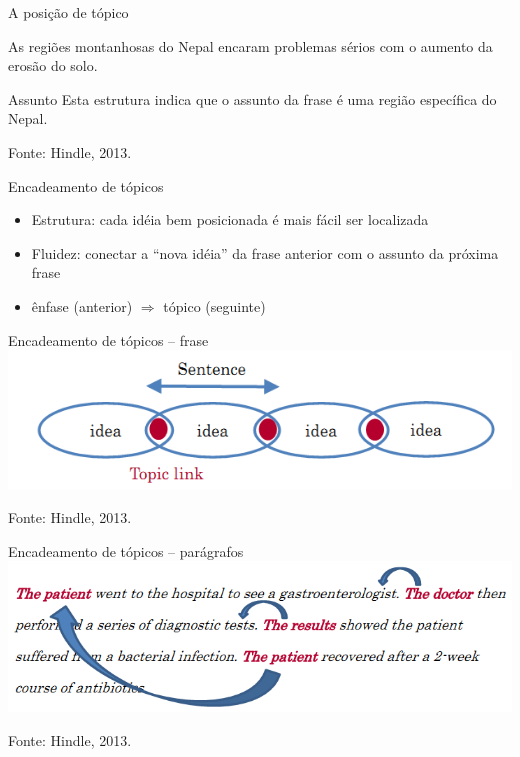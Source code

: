 \documentclass{beamer}
\begin{document}
\begin{frame}{A posição de tópico}
  \begin{example}
    As \alert<3->{regiões montanhosas do Nepal} encaram problemas sérios com o
    aumento da erosão do solo.
  \end{example}
  \begin{block}{Assunto}
    Esta estrutura indica que o assunto da frase é \alert<3->{uma
      região específica} do Nepal.
  \end{block}

  \vfill
  Fonte: Hindle, 2013.
\end{frame}

\begin{frame}{Encadeamento de tópicos}
  \begin{itemize}
  \item Estrutura: cada idéia bem posicionada é mais fácil ser
    localizada
  \item Fluidez: conectar a ``nova idéia'' da frase anterior com o
    assunto da próxima frase
  \item ênfase (anterior) $\Rightarrow$ tópico (seguinte)
  \end{itemize}
\end{frame}

\begin{frame}{Encadeamento de tópicos -- frase}
  \includegraphics[width=\textwidth]{Escrita/encadeamento1}

  \vfill
  Fonte: Hindle, 2013.
\end{frame}

\begin{frame}{Encadeamento de tópicos -- parágrafos}
    \includegraphics[width=\textwidth]{Escrita/encadeamento2}

  \vfill
  Fonte: Hindle, 2013.
\end{frame}
\end{document}
